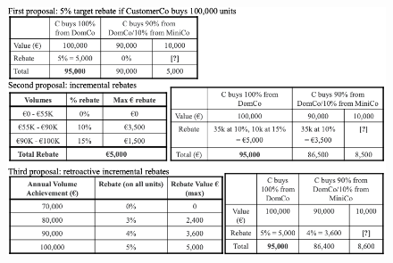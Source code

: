         \begin{figure}[ht]
            \centering
            \includegraphics[width=0.75\linewidth]{graphics/L11-3.png}
        \end{figure}

    